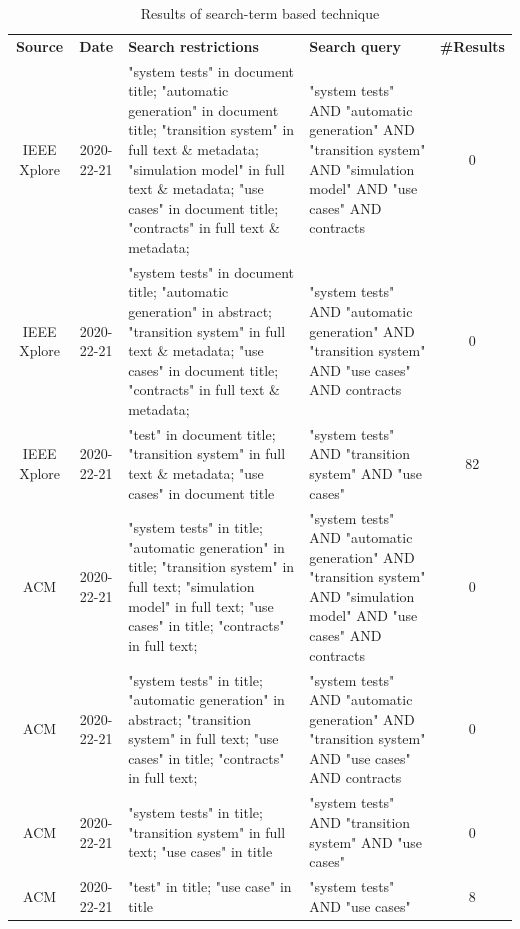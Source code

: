 \begin{small}
	\centering
	\begin{longtable}[h]{c|c|p{}|p{}|c}
		\caption{Results of search-term based technique}\label{search-term}\setlength{\tabcolsep}{1em}\\    %
		\hline
		\textbf{Source} & \textbf{Date} & \textbf{Search restrictions} & \textbf{Search query} & \textbf{\#Results} \\
		\hline
		\hline	
		IEEE Xplore & 2020-22-21 & "system tests" in document title; "automatic generation" in document title; "transition system" in full text \& metadata; "simulation model" in full text \& metadata; "use cases" in document title; "contracts" in full text \& metadata; & "system tests" AND "automatic generation" AND "transition system" AND "simulation model" AND "use cases" AND contracts & 0 \\
		\hline
		IEEE Xplore & 2020-22-21 & "system tests" in document title; "automatic generation" in abstract; "transition system" in full text \& metadata; "use cases" in document title; "contracts" in full text \& metadata; & "system tests" AND "automatic generation" AND "transition system" AND "use cases" AND contracts & 0 \\
		\hline
		IEEE Xplore & 2020-22-21 & "test" in document title; "transition system" in full text \& metadata; "use cases" in document title & "system tests" AND "transition system" AND "use cases" & 82 \\
		\hline
		\hline
		ACM & 2020-22-21 & "system tests" in title; "automatic generation" in title; "transition system" in full text; "simulation model" in full text; "use cases" in title; "contracts" in full text; & "system tests" AND "automatic generation" AND "transition system" AND "simulation model" AND "use cases" AND contracts & 0 \\
		\hline
		ACM & 2020-22-21 & "system tests" in title; "automatic generation" in abstract; "transition system" in full text; "use cases" in title; "contracts" in full text; & "system tests" AND "automatic generation" AND "transition system" AND "use cases" AND contracts & 0 \\
		\hline
		ACM & 2020-22-21 & "system tests" in title; "transition system" in full text; "use cases" in title & "system tests" AND "transition system" AND "use cases" & 0 \\
		\hline
		ACM & 2020-22-21 & "test" in title; "use case" in title & "system tests" AND "use cases" & 8 \\
		\hline
	\end{longtable}
\end{small}

